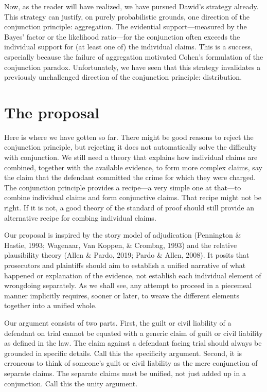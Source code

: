 \documentclass[
  10pt,
  dvipsnames,enabledeprecatedfontcommands]{scrartcl}
\begin{document}
Now, as the reader will have realized, we have pursued Dawid's strategy
already. This strategy can justify, on purely probabilistic grounds, one
direction of the conjunction principle: aggregation. The evidential
support---measured by the Bayes' factor or the likelihood ratio---for
the conjunction often exceeds the individual support for (at least one
of) the individual claims. This is a success, especially because the
failure of aggregation motivated Cohen's formulation of the conjunction
paradox. Unfortunately, we have seen that this strategy invalidates a
previously unchallenged direction of the conjunction principle:
distribution.

\hypertarget{the-proposal}{%
\section{The proposal}\label{the-proposal}}

Here is where we have gotten so far. There might be good reasons to
reject the conjunction principle, but rejecting it does not
automatically solve the difficulty with conjunction. We still need a
theory that explains how individual claims are combined, together with
the available evidence, to form more complex claims, say the claim that
the defendant committed the crime for which they were charged. The
conjunction principle provides a recipe---a very simple one at that---to
combine individual claims and form conjunctive claims. That recipe might
not be right. If it is not, a good theory of the standard of proof
should still provide an alternative recipe for combing individual
claims.

Our proposal is inspired by the story model of adjudication (Pennington
\& Hastie, 1993; Wagenaar, Van Koppen, \& Crombag, 1993) and the
relative plausibility theory (Allen \& Pardo, 2019; Pardo \& Allen,
2008). It posits that prosecutors and plaintiffs should aim to establish
a unified narrative of what happened or explanation of the evidence, not
establish each individual element of wrongdoing separately. As we shall
see, any attempt to proceed in a piecemeal manner implicitly requires,
sooner or later, to weave the different elements together into a unified
whole.

Our argument consists of two parts. First, the guilt or civil liability
of a defendant on trial cannot be equated with a generic claim of guilt
or civil liability as defined in the law. The claim against a defendant
facing trial should always be grounded in specific details. Call this
the specificity argument. Second, it is erroneous to think of someone's
guilt or civil liability as the mere conjunction of separate claims. The
separate claims must be unified, not just added up in a conjunction.
Call this the unity argument.
\end{document}
